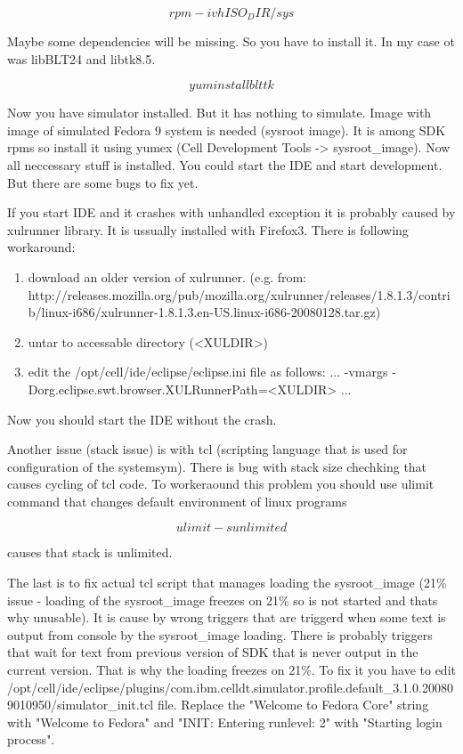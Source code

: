 \begin{equation}
rpm -ivh ISO_DIR/sys
\end{equation}

Maybe some dependencies will be missing. So you have to install it. In my case ot was libBLT24 and libtk8.5.

\begin{equation}
yum install blt tk
\end{equation}

Now you have simulator installed. But it has nothing to simulate. Image with image of simulated Fedora 9 system is needed (sysroot image). It is among SDK rpms so install it using yumex (Cell Development Tools -> sysroot_image).
Now all neccessary stuff is installed. You could start the IDE and start development. But there are some bugs to fix yet. 

If you start IDE and it crashes with unhandled exception it is probably caused by xulrunner library. It is ussually installed with Firefox3. There is following workaround:
\begin{enumerate}
\item download an older version of xulrunner. (e.g. from: http://releases.mozilla.org/pub/mozilla.org/xulrunner/releases/1.8.1.3/contrib/linux-i686/xulrunner-1.8.1.3.en-US.linux-i686-20080128.tar.gz)
\item untar to accessable directory (<XULDIR>)
\item edit the /opt/cell/ide/eclipse/eclipse.ini file as follows:
...
-vmargs
-Dorg.eclipse.swt.browser.XULRunnerPath=<XULDIR>
...
\end{enumerate}
Now you should start the IDE without the crash.

Another issue (stack issue) is with tcl (scripting language that is used for configuration of the systemsym). There is bug with stack size chechking that causes cycling of tcl code. To workeraound this problem you should use ulimit command that changes default environment of linux programs

\begin{equation}
ulimit -s unlimited
\end{equation}

causes that stack is unlimited.

The last is to fix actual tcl script that manages loading the sysroot_image (21\% issue - loading of the sysroot_image freezes on 21\% so is not started and thats why unusable). It is cause by wrong triggers that are triggerd when some text is output from console by the sysroot_image loading. There is probably triggers that wait for text from previous version of SDK that is never output in the current version. That is why the loading freezes on 21\%. To fix it you have to edit /opt/cell/ide/eclipse/plugins/com.ibm.celldt.simulator.profile.default_3.1.0.200809010950/simulator_init.tcl file. Replace the "Welcome to Fedora Core" string with "Welcome to Fedora" and "INIT: Entering runlevel: 2" with "Starting login process".

